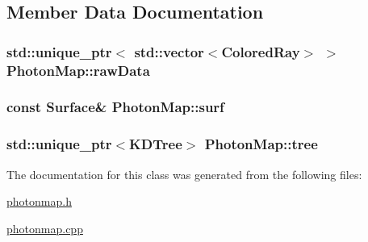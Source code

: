 \subsection{Member Data Documentation}
\subsubsection[{\texorpdfstring{raw\+Data}{rawData}}]{\setlength{\rightskip}{0pt plus 5cm}std\+::unique\+\_\+ptr$<$ std\+::vector$<${\bf Colored\+Ray}$>$ $>$ Photon\+Map\+::raw\+Data\hspace{0.3cm}{\ttfamily [private]}}\hypertarget{classPhotonMap_a20419eecb0781c24cbda8210bc0df221}{}\label{classPhotonMap_a20419eecb0781c24cbda8210bc0df221}
\subsubsection[{\texorpdfstring{surf}{surf}}]{\setlength{\rightskip}{0pt plus 5cm}const {\bf Surface}\& Photon\+Map\+::surf\hspace{0.3cm}{\ttfamily [private]}}\hypertarget{classPhotonMap_a347cfa86f86fd505194780438f1fb1d8}{}\label{classPhotonMap_a347cfa86f86fd505194780438f1fb1d8}
\subsubsection[{\texorpdfstring{tree}{tree}}]{\setlength{\rightskip}{0pt plus 5cm}std\+::unique\+\_\+ptr$<${\bf K\+D\+Tree}$>$ Photon\+Map\+::tree\hspace{0.3cm}{\ttfamily [private]}}\hypertarget{classPhotonMap_aab0b914c435f74e2ce85fab273d94030}{}\label{classPhotonMap_aab0b914c435f74e2ce85fab273d94030}


The documentation for this class was generated from the following files\+:\begin{DoxyCompactItemize}
\item 
\hyperlink{photonmap_8h}{photonmap.\+h}\item 
\hyperlink{photonmap_8cpp}{photonmap.\+cpp}\end{DoxyCompactItemize}
